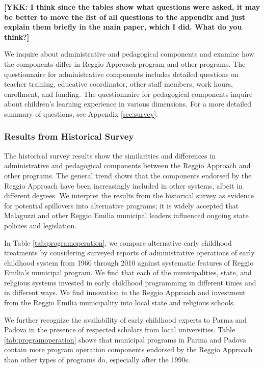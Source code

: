 \noindent\textbf{[YKK: I think since the tables show what questions were asked, it may be better to move the list of all questions to the appendix and just explain them briefly in the main paper, which I did. What do you think?]}

We inquire about administrative and pedagogical components and examine how the components differ in Reggio Approach program and other programs. The questionnaire for administrative components includes detailed questions on teacher training, educative coordinator, other staff members, work hours, enrollment, and funding. The questionnaire for pedagogical components inquire about children's learning experience in various dimensions. For a more detailed summary of questions, see Appendix \ref{sec:survey}.


\subsubsection{Results from Historical Survey}

The historical survey results show the similarities and differences in administrative and pedagogical components between the Reggio Approach and other programs. The general trend shows that the components endorsed by the Reggio Approach have been increasingly included in other systems, albeit in different degrees. We interpret the results from the historical survey as evidence for potential spillovers into alternative programs; it is widely accepted that Malaguzzi and other Reggio Emilia municipal leaders influenced ongoing state policies and legislation. 

In Table \ref{tab:programoperation}, we compare alternative early childhood treatments by considering surveyed reports of administrative operations of early childhood system from 1960 through 2010 against systematic features of Reggio Emilia's municipal program. We find that each of the municipalities, state, and religious systems invested in early childhood programming in different times and in different ways. We find innovation in the Reggio Approach and investment from the Reggio Emilia municipality into local state and religious schools. 

We further recognize the availability of early childhood experts to Parma and Padova in the presence of respected scholars from local universities. Table \ref{tab:programoperation} shows that municipal programs in Parma and Padova contain more program operation components endorsed by the Reggio Approach than other types of programs do, especially after the 1990s.

